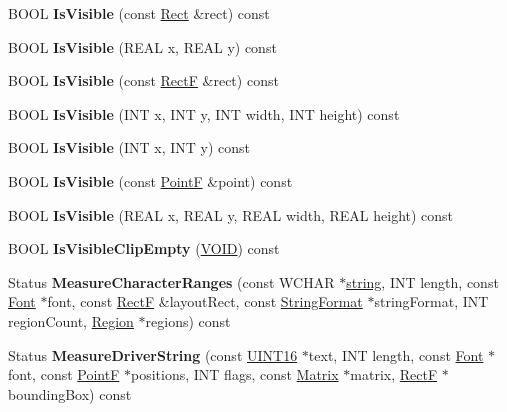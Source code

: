 \begin{DoxyCompactItemize}
B\+O\+OL {\bfseries Is\+Visible} (const \hyperlink{struct_rect}{Rect} \&rect) const
\item 
\mbox{\label{class_graphics_a67ae8b16a54f0b310b39cbb7863be012}} 
B\+O\+OL {\bfseries Is\+Visible} (R\+E\+AL x, R\+E\+AL y) const
\item 
\mbox{\label{class_graphics_acada8b50f1c0f554c23eb9abee2d0a73}} 
B\+O\+OL {\bfseries Is\+Visible} (const \hyperlink{struct_rect_f}{RectF} \&rect) const
\item 
\mbox{\label{class_graphics_aa5ec8a50274135bdbff353cb3c409eb1}} 
B\+O\+OL {\bfseries Is\+Visible} (I\+NT x, I\+NT y, I\+NT width, I\+NT height) const
\item 
\mbox{\label{class_graphics_ad2ce2eec17da2edae732a81a2941f314}} 
B\+O\+OL {\bfseries Is\+Visible} (I\+NT x, I\+NT y) const
\item 
\mbox{\label{class_graphics_ad2eca44203d7cc651116a4befdcfc6bb}} 
B\+O\+OL {\bfseries Is\+Visible} (const \hyperlink{struct_point_f}{PointF} \&point) const
\item 
\mbox{\label{class_graphics_a5b547ac7c35ad672c7b38b3cf7711c34}} 
B\+O\+OL {\bfseries Is\+Visible} (R\+E\+AL x, R\+E\+AL y, R\+E\+AL width, R\+E\+AL height) const
\item 
\mbox{\label{class_graphics_a85069f0389f84aff32920b6aae9b89a4}} 
B\+O\+OL {\bfseries Is\+Visible\+Clip\+Empty} (\hyperlink{interfacevoid}{V\+O\+ID}) const
\item 
\mbox{\label{class_graphics_acaaecb8e8e6b1d45691bf93610a82f96}} 
Status {\bfseries Measure\+Character\+Ranges} (const W\+C\+H\+AR $\ast$\hyperlink{structstring}{string}, I\+NT length, const \hyperlink{class_font}{Font} $\ast$font, const \hyperlink{struct_rect_f}{RectF} \&layout\+Rect, const \hyperlink{class_string_format}{String\+Format} $\ast$string\+Format, I\+NT region\+Count, \hyperlink{class_region}{Region} $\ast$regions) const
\item 
\mbox{\label{class_graphics_a3361aa47be9c7a7d825c03b0cc26cb56}} 
Status {\bfseries Measure\+Driver\+String} (const \hyperlink{_processor_bind_8h_a09f1a1fb2293e33483cc8d44aefb1eb1}{U\+I\+N\+T16} $\ast$text, I\+NT length, const \hyperlink{class_font}{Font} $\ast$font, const \hyperlink{struct_point_f}{PointF} $\ast$positions, I\+NT flags, const \hyperlink{class_matrix}{Matrix} $\ast$matrix, \hyperlink{struct_rect_f}{RectF} $\ast$bounding\+Box) const

\end{DoxyCompactItemize}
